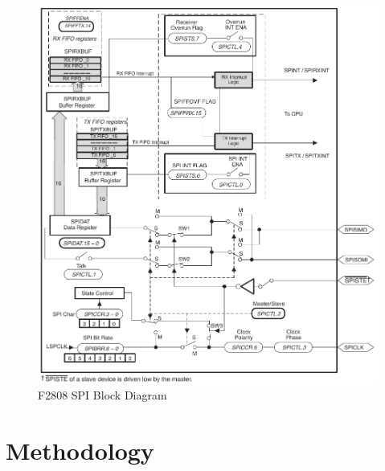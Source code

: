 \begin{figure}[ptb]
	\begin{centering}
		\includegraphics[scale=0.75]{Hardware/Figures/hardware-f2808_spi.pdf}
		\caption[F2808 SPI Block Diagram]{F2808 SPI Block Diagram\cite{ref:2006-ti-f2808_spi}}
		\label{fig:hardware:f2808_spi}
	\end{centering}
\end{figure}

\section{Methodology}\label{sec:hardware:methodology}

